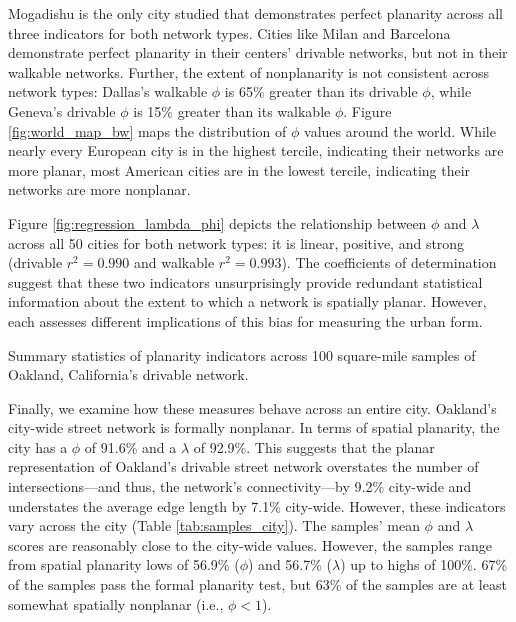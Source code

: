 \documentclass[Afour,doublespace,sageh,times]{sagej}
\begin{document}
Mogadishu is the only city studied that demonstrates perfect planarity across all three indicators for both network types. Cities like Milan and Barcelona demonstrate perfect planarity in their centers' drivable networks, but not in their walkable networks. Further, the extent of nonplanarity is not consistent across network types: Dallas's walkable $\phi$ is 65\% greater than its drivable $\phi$, while Geneva's drivable $\phi$ is 15\% greater than its walkable $\phi$. Figure \ref{fig:world_map_bw} maps the distribution of $\phi$ values around the world. While nearly every European city is in the highest tercile, indicating their networks are more planar, most American cities are in the lowest tercile, indicating their networks are more nonplanar.

Figure \ref{fig:regression_lambda_phi} depicts the relationship between $\phi$ and $\lambda$ across all 50 cities for both network types: it is linear, positive, and strong (drivable $r^2=0.990$ and walkable $r^2=0.993$). The coefficients of determination suggest that these two indicators unsurprisingly provide redundant statistical information about the extent to which a network is spatially planar. However, each assesses different implications of this bias for measuring the urban form.

\begin{table}[htbp]
	\centering
	\caption{Summary statistics of planarity indicators across 100 square-mile samples of Oakland, California's drivable network.}
	\label{tab:samples_city}
	
\end{table}

Finally, we examine how these measures behave across an entire city. Oakland's city-wide street network is formally nonplanar. In terms of spatial planarity, the city has a $\phi$ of 91.6\% and a $\lambda$ of 92.9\%. This suggests that the planar representation of Oakland's drivable street network overstates the number of intersections---and thus, the network's connectivity---by 9.2\% city-wide and understates the average edge length by 7.1\% city-wide. However, these indicators vary across the city (Table \ref{tab:samples_city}). The samples' mean $\phi$ and $\lambda$ scores are reasonably close to the city-wide values. However, the samples range from spatial planarity lows of 56.9\% ($\phi$) and 56.7\% ($\lambda$) up to highs of 100\%. 67\% of the samples pass the formal planarity test, but 63\% of the samples are at least somewhat spatially nonplanar (i.e., $\phi < 1$).
\end{document}
